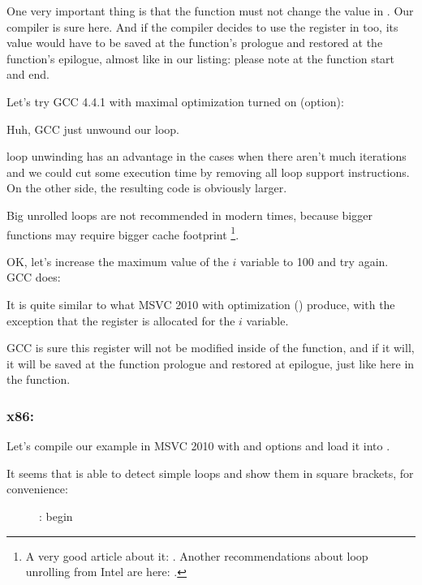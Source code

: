 One very important thing is that the \ttf function must not change the value in \ESI.
Our compiler is sure here. 
And if the compiler decides to use the \ESI register in \ttf too, its value would have to be saved 
at the function's prologue and restored at the function's epilogue,
almost like in our listing: please note 
at the function start and end.

Let's try GCC 4.4.1 with maximal optimization turned on (\Othree option):




Huh, GCC just unwound our loop.

\Gls{loop unwinding} has an advantage in the cases when there aren't much iterations and 
we could cut some execution time by removing all loop support instructions. 
On the other side, the resulting code is obviously larger.

Big unrolled loops are not recommended in modern times, because bigger functions
may require bigger cache footprint%
%
\footnote{A very good article about it: \DrepperMemory.
Another recommendations about loop unrolling from Intel are here: 
.}.

OK, let's increase the maximum value of the $i$ variable to 100 and try again. GCC does:



It is quite similar to what MSVC 2010 with optimization (\Ox) produce, 
with the exception that the \EBX register is allocated for the $i$ variable.

GCC is sure this register will not be modified inside of the \ttf function, 
and if it will, it will be saved at the function prologue and restored at epilogue, 
just like here in the \main function.

\clearpage
\subsubsection{x86: \olly}
\myindex{\olly}

Let's compile our example in MSVC 2010 with \Ox and \Obzero 
options and load it into \olly.

It seems that \olly is able to detect simple loops and show them in square brackets, for convenience:

\begin{figure}[H]
\centering
{}
\caption{\olly: \main begin}
\label{fig:loops_olly_1}
\end{figure}

